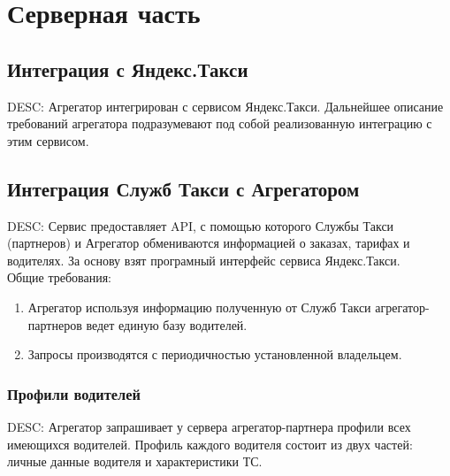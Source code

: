 \section{Серверная часть}

	\subsection{Интеграция с Яндекс.Такси}

			DESC: Агрегатор интегрирован с сервисом Яндекс.Такси. Дальнейшее описание требований агрегатора подразумевают под собой реализованную интеграцию с этим сервисом.  

	\subsection{Интеграция Служб Такси с Агрегатором}

		DESC: Сервис предоставляет API, с помощью которого Службы Такси (партнеров) и Агрегатор обмениваются информацией о заказах, тарифах и водителях. За основу взят програмный интерфейс сервиса Яндекс.Такси.\\

		Общие требования:
		\begin{enumerate}
			\item Агрегатор используя информацию полученную от Служб Такси агрегатор-партнеров ведет единую базу водителей.
			\item Запросы производятся с периодичностью установленной владельцем.
		\end{enumerate}

		\subsubsection{Профили водителей}

			DESC: Агрегатор запрашивает у сервера агрегатор-партнера профили всех имеющихся водителей. Профиль каждого водителя состоит из двух частей: личные данные водителя и характеристики ТС.

